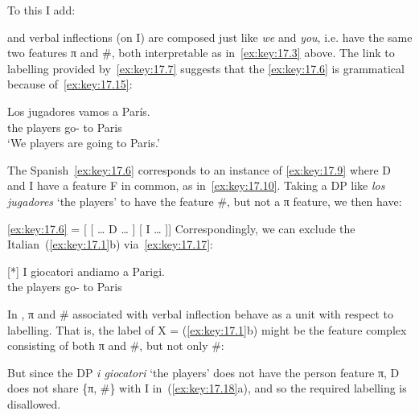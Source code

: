 \documentclass[output=paper]{langsci/langscibook}
\begin{document}
To this I add:

\ea\label{ex:key:17.14}
    \Fpl{} and \Spl{} verbal inflections (on I) are composed just like \emph{we}
    and \emph{you}, i.e. have the same two features π and \#, both interpretable
    as in~\eqref{ex:key:17.3} above.
\z
The link to labelling provided by~\eqref{ex:key:17.7} suggests that the 
\eqref{ex:key:17.6} is grammatical because of~\eqref{ex:key:17.15}:

\begin{exe}
\exi{\eqref{ex:key:17.6}}
    \gll    Los jugadores vamos a París.\\
            the players      go-\Fpl{} to Paris\\
    \glt    ‘We players are going to Paris.’\\
\end{exe}

\ea\label{ex:key:17.15}
    The Spanish~\eqref{ex:key:17.6} corresponds to an instance of \eqref{ex:key:17.9}
    where D and I have a feature F in common, as in~\eqref{ex:key:17.10}.
\z
Taking a DP like \emph{los jugadores} ‘the players’ to have the feature \#, but
not a π feature, we then have:

\ea\label{ex:key:17.16}
    \eqref{ex:key:17.6} = [ [ \dots{} D\tss{\#} \dots{} ] [ I\tss{\#} \dots{} ]]
\z
Correspondingly, we can exclude the Italian~(\ref{ex:key:17.1}b)
via~\eqref{ex:key:17.17}:

\begin{exe}
    \exi{\eqref{ex:key:17.1}}
    \begin{xlist}
    [*]{%
    \gll I giocatori andiamo a Parigi.\\
    the players go-\Fpl{} to Paris\\
    \glt}
    \end{xlist}
\end{exe}
\ea\label{ex:key:17.17}
    In , π and \# associated with verbal inflection behave as a unit
    with respect to labelling.
\z
That is, the label of X = (\ref{ex:key:17.1}b) might be the feature complex
consisting of both π and \#, but not only \#:

\ea\label{ex:key:17.18}
    \z
\z
But since the DP \emph{i giocatori} ‘the players’ does not have the person
feature π, D does not share \{π, \#\} with I in~(\ref{ex:key:17.18}a), and so the
required labelling is disallowed.
\end{document}
